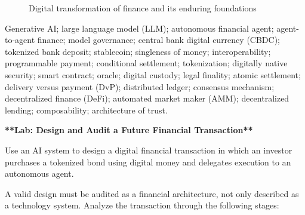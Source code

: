 \begin{figure}[H]

\caption{Digital transformation of finance and its enduring foundations}
\label{fig:ch24-future-finance-framework}

\end{figure}




Generative AI; large language model (LLM); autonomous financial agent;
agent-to-agent finance; model governance;
central bank digital currency (CBDC); tokenized bank deposit; stablecoin;
singleness of money; interoperability;
programmable payment; conditional settlement; tokenization;
digitally native security; smart contract; oracle;
digital custody; legal finality; atomic settlement;
delivery versus payment (DvP);
distributed ledger; consensus mechanism;
decentralized finance (DeFi); automated market maker (AMM);
decentralized lending; composability; architecture of trust.




\textbf{**Lab: Design and Audit a Future Financial Transaction**}

Use an AI system to design a digital financial transaction in which an investor purchases a tokenized bond using digital money and delegates execution to an autonomous agent.

A valid design must be audited as a financial architecture, not only described as a technology system. Analyze the transaction through the following stages:

